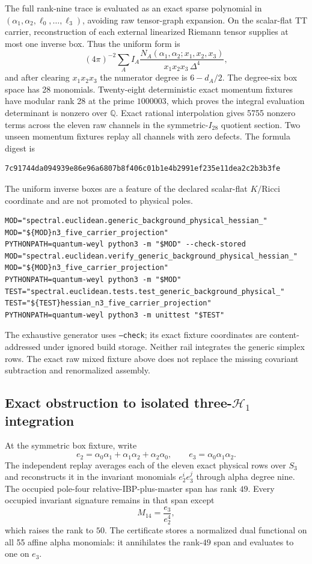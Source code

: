 \documentclass[11pt]{article}
\theoremstyle{definition}
\theoremstyle{remark}
\begin{document}
The full rank-nine trace is evaluated as an exact sparse polynomial in
$(\alpha_1,\alpha_2,\ell_0,\ldots,\ell_3)$, avoiding raw tensor-graph
expansion.  On the scalar-flat TT carrier, reconstruction of each external
linearized Riemann tensor supplies at most one inverse box.  Thus the uniform
form is
\[
 (4\pi)^{-2}\sum_A I_A
 \frac{N_A(\alpha_1,\alpha_2;x_1,x_2,x_3)}
 {x_1x_2x_3\,\Delta^4},
\]
and after clearing $x_1x_2x_3$ the numerator degree is $6-d_A/2$.
The degree-six box space has 28 monomials.  Twenty-eight deterministic exact
momentum fixtures have modular rank 28 at the prime $1000003$, which proves
the integral evaluation determinant is nonzero over $\mathbb Q$.  Exact
rational interpolation gives 5755 nonzero terms across the eleven raw
channels in the symmetric-$I_{28}$ quotient section.  Two unseen momentum
fixtures replay all channels with zero defects.  The formula digest is
\begin{verbatim}
7c91744da094939e86e96a6807b8f406c01b1e4b2991ef235e11dea2c2b3b3fe
\end{verbatim}
The uniform inverse boxes are a feature of the declared scalar-flat
$K/\mathrm{Ricci}$ coordinate and are not promoted to physical poles.

\begin{verbatim}
MOD="spectral.euclidean.generic_background_physical_hessian_"
MOD="${MOD}n3_five_carrier_projection"
PYTHONPATH=quantum-weyl python3 -m "$MOD" --check-stored
MOD="spectral.euclidean.verify_generic_background_physical_hessian_"
MOD="${MOD}n3_five_carrier_projection"
PYTHONPATH=quantum-weyl python3 -m "$MOD"
TEST="spectral.euclidean.tests.test_generic_background_physical_"
TEST="${TEST}hessian_n3_five_carrier_projection"
PYTHONPATH=quantum-weyl python3 -m unittest "$TEST"
\end{verbatim}

The exhaustive generator uses \texttt{--check}; its exact fixture coordinates are
content-addressed under ignored build storage.  Neither rail integrates the
generic simplex rows.  The exact raw mixed fixture above does not replace the
missing covariant subtraction and renormalized assembly.

\subsection{\texorpdfstring{Exact obstruction to isolated three-$\mathcal H_1$ integration}{Exact obstruction to isolated three-H1 integration}}

At the symmetric box fixture, write
\[
 e_2=\alpha_0\alpha_1+\alpha_1\alpha_2+\alpha_2\alpha_0,
 \qquad e_3=\alpha_0\alpha_1\alpha_2.
\]
The independent replay averages each of the eleven exact physical rows over
$S_3$ and reconstructs it in the invariant monomials $e_2^ie_3^j$ through
alpha degree nine.  The occupied pole-four relative-IBP-plus-master span has
rank $49$.  Every occupied invariant signature remains in that span except
\[
 M_{14}=\frac{e_3}{e_2^4},
\]
which raises the rank to $50$.  The certificate stores a normalized dual
functional on all 55 affine alpha monomials: it annihilates the rank-$49$
span and evaluates to one on $e_3$.
\end{document}
